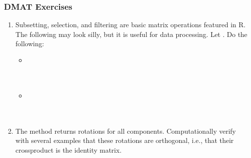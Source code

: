 \begin{frame}[fragile]
\frametitle{DMAT Exercises}
\begin{enumerate}
 \item  Subsetting, selection, and filtering are basic matrix operations featured
in R. The following may look silly, but it is useful for data
processing.  Let .  Do the following:
\begin{itemize}
\item
   \\
   \\
\\[.2cm]
\item
   \\
   \\
   \\
\end{itemize}

\item The  method returns rotations for all components.  Computationally verify with several examples that these rotations are orthogonal, i.e., that their crossproduct is the identity matrix.
\end{enumerate}
\end{frame}